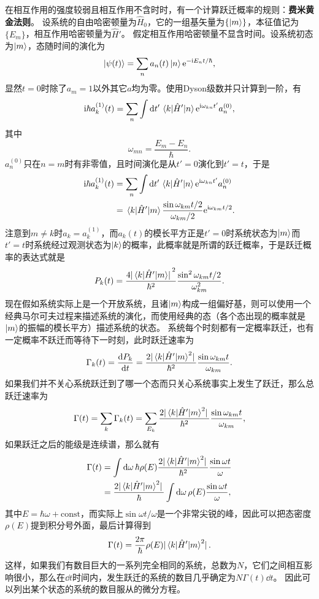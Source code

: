 \documentclass[hyperref, UTF8, a4paper]{ctexart}
\newcommand*{\ii}{\mathrm{i}}
\newcommand*{\ee}{\mathrm{e}}
\newcommand*{\const}{\mathrm{const}}
\begin{document}

在相互作用的强度较弱且相互作用不含时时，有一个计算跃迁概率的规则：\textbf{费米黄金法则}。
设系统的自由哈密顿量为$\hat{H}_0$，它的一组基矢量为$\{\ket{m}\}$，本征值记为$\{E_m\}$，相互作用哈密顿量为$\hat{H}'$。
假定相互作用哈密顿量不显含时间。设系统初态为$\ket{m}$，态随时间的演化为
\[
    \ket{\psi(t)} = \sum_n a_n(t) \ket{n} \ee^{- \ii E_n t / \hbar},
\]
显然$t=0$时除了$a_m=1$以外其它$a$均为零。使用Dyson级数并只计算到一阶，有
\[
    \ii \hbar a^{(1)}_k(t) = \sum_n \int \dd{t'} \mel{k}{\hat{H}'}{n} \ee^{\ii \omega_{kn} t'} a_n^{(0)},
\]
其中
\[
    \omega_{mn} = \frac{E_m - E_n}{\hbar}.
\]
$a_n^{(0)}$只在$n=m$时有非零值，且时间演化是从$t'=0$演化到$t'=t$，于是
\[
    \begin{aligned}
        \ii \hbar a^{(1)}_k(t) &= \sum_n \int \dd{t'} \mel{k}{\hat{H}'}{n} \ee^{\ii \omega_{kn} t'} a_n^{(0)} \\
        &= \mel{k}{\hat{H}'}{m} \frac{\sin \omega_{km} t / 2}{\omega_{km} / 2} \ee^{\ii \omega_{km} t / 2}. 
    \end{aligned}
\]
注意到$m \neq k$时$a_k = a_k^{(1)}$，而$a_k(t)$的模长平方正是$t'=0$时系统状态为$\ket{m}$而$t'=t$时系统经过观测状态为$\ket{k}$的概率，此概率就是所谓的跃迁概率，于是跃迁概率的表达式就是
\begin{equation}
    P_k(t) = \frac{4 \abs*{\mel{k}{\hat{H}'}{m}}^2}{\hbar^2} \frac{\sin^2 \omega_{km} t / 2}{\omega_{km}^2}.
\end{equation}
现在假如系统实际上是一个开放系统，且诸$\ket{m}$构成一组偏好基，则可以使用一个经典马尔可夫过程来描述系统的演化，而使用经典的态（各个态出现的概率就是$\ket{m}$的振幅的模长平方）描述系统的状态。
系统每个时刻都有一定概率跃迁，也有一定概率不跃迁而等待下一时刻，此时跃迁速率为
\begin{equation}
    \Gamma_k(t) = \dv{P_k}{t} = \frac{2 \abs*{\mel{k}{\hat{H}'}{m}^2}}{\hbar^2} \frac{\sin \omega_{km} t}{\omega_{km}}.
\end{equation}
如果我们并不关心系统跃迁到了哪一个态而只关心系统事实上发生了跃迁，那么总跃迁速率为
\[
    \Gamma(t) = \sum_k \Gamma_k(t) = \sum_{E_k} \frac{2 \abs*{\mel{k}{\hat{H}'}{m}^2}}{\hbar^2} \frac{\sin \omega_{km} t}{\omega_{km}},
\]
如果跃迁之后的能级是连续谱，那么就有
\[
    \begin{aligned}
        \Gamma(t) &= \int \dd{\omega} \hbar \rho(E) \frac{2 \abs*{\mel{k}{\hat{H}'}{m}^2}}{\hbar^2} \frac{\sin \omega t}{\omega} \\
        &= \frac{2 \abs*{\mel{k}{\hat{H}'}{m}^2}}{\hbar} \int \dd{\omega} \rho(E) \frac{\sin \omega t}{\omega}, 
    \end{aligned}
\]
其中$E = \hbar \omega + \const$，而实际上$\sin \omega t / \omega$是一个非常尖锐的峰，因此可以把态密度$\rho(E)$提到积分号外面，最后计算得到
\begin{equation}
    \Gamma(t) = \frac{2\pi}{\hbar} \rho(E) \abs*{\mel{k}{\hat{H}'}{m}^2}.
\end{equation}
这样，如果我们有数目巨大的一系列完全相同的系统，总数为$N$，它们之间相互影响很小，那么在$\dd{t}$时间内，发生跃迁的系统的数目几乎确定为$N \Gamma(t) \dd{t}$。
因此可以列出某个状态的系统的数目服从的微分方程。
\end{document}
